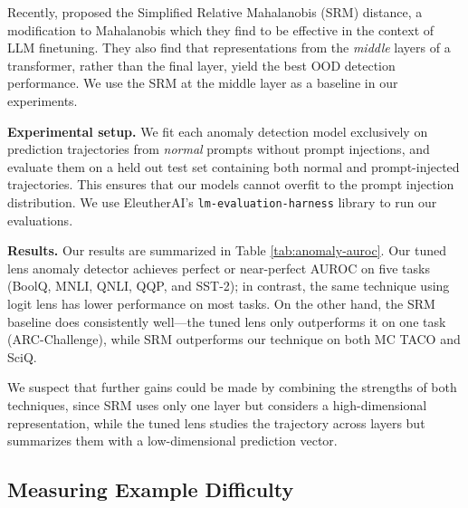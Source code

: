 \documentclass{article}
\theoremstyle{plain}
\theoremstyle{definition}
\begin{document}
Recently, \citet{bai2022training} proposed the Simplified Relative Mahalanobis (SRM) distance, a modification to Mahalanobis which they find to be effective in the context of LLM finetuning. They also find that representations from the \emph{middle} layers of a transformer, rather than the final layer, yield the best OOD detection performance. We use the SRM at the middle layer as a baseline in our experiments.

\textbf{Experimental setup.} 
We fit each anomaly detection model exclusively on prediction trajectories from \emph {normal} prompts without prompt injections, and evaluate them on a held out test set containing both normal and prompt-injected trajectories. This ensures that our models cannot overfit to the prompt injection distribution. We use EleutherAI's \texttt{lm-evaluation-harness} library \cite{eval-harness} to run our evaluations.

\textbf{Results.}
Our results are summarized in Table \ref{tab:anomaly-auroc}. Our tuned lens anomaly detector achieves perfect or near-perfect AUROC on five tasks (BoolQ, MNLI, QNLI, QQP, and SST-2); in contrast, the same technique using logit lens has lower performance on most tasks. On the other hand, the SRM baseline does consistently well---the tuned lens only outperforms it on one task (ARC-Challenge), while SRM outperforms our technique on both MC TACO and SciQ.


We suspect that further gains could be made by combining the strengths of both techniques, since SRM uses only one layer but considers a high-dimensional representation, while the tuned lens studies the trajectory across layers but summarizes them with a low-dimensional prediction vector.

\subsection{Measuring Example Difficulty}
\label{example-difficulty}
\end{document}
